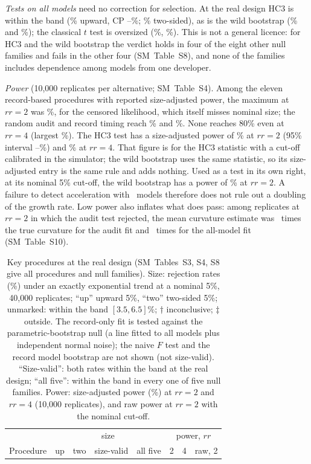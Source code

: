 \documentclass[aps,pre,twocolumn,superscriptaddress,nofootinbib,10pt]{revtex4-2}
\newcommand{\SM}{SM}
\newcommand{\rr}{rr}
\begin{document}
\emph{Tests on all models} need no correction for selection. At the real design HC3 is within the band (\aTwoHcUp\% upward, CP \aTwoHcUpLo--\aTwoHcUpHi\%; \aTwoHcTwo\% two-sided), as is the wild bootstrap (\aTwoWildUp\% and \aTwoWildTwo\%); the classical $t$ test is oversized (\aTwoOlsUp\%, \aTwoOlsTwo\%). This is not a general licence: for HC3 and the wild bootstrap the verdict holds in four of the eight other null families and fails in the other four (\SM\ Table~S8), and none of the families includes dependence among models from one developer.

\emph{Power} (10{,}000 replicates per alternative; \SM\ Table~S4). Among the eleven record-based procedures with reported size-adjusted power, the maximum at $\rr=2$ was \powMaxTwo\%, for the censored likelihood, which itself misses nominal size; the random audit and record timing reach \powAuditTwo\% and \powRrateTwo\%. None reaches 80\% even at $\rr=4$ (largest \powMaxFour\%). The HC3 test has a size-adjusted power of \aTwoPowHcTwo\% at $\rr=2$ (95\% interval \aTwoPowHcTwoLo--\aTwoPowHcTwoHi\%) and \aTwoPowHcFour\% at $\rr=4$. That figure is for the HC3 statistic with a cut-off calibrated in the simulator; the wild bootstrap uses the same statistic, so its size-adjusted entry is the same rule and adds nothing. Used as a test in its own right, at its nominal 5\% cut-off, the wild bootstrap has a power of \aTwoRawWildTwo\% at $\rr=2$. A failure to detect acceleration with \nModels\ models therefore does not rule out a doubling of the growth rate. Low power also inflates what does pass: among replicates at $\rr=2$ in which the audit test rejected, the mean curvature estimate was \typeMAuditTwo\ times the true curvature for the audit fit and \typeMAllTwo\ times for the all-model fit \cite{gelman2014} (\SM\ Table~S10).

\begin{table}[t]
\caption{Key procedures at the real design (\SM\ Tables~S3, S4, S8 give all procedures and null families). Size: rejection rates (\%) under an exactly exponential trend at a nominal 5\%, 40{,}000 replicates; ``up'' upward 5\%, ``two'' two-sided 5\%; unmarked: within the band $[3.5,6.5]\%$; $\dagger$ inconclusive; $\ddagger$ outside. The record-only fit is tested against the parametric-bootstrap null (a line fitted to all models plus independent normal noise); the naive $F$ test and the record model bootstrap are not shown (not size-valid). ``Size-valid'': both rates within the band at the real design; ``all five'': within the band in every one of five null families. Power: size-adjusted power (\%) at $\rr=2$ and $\rr=4$ (10{,}000 replicates), and raw power at $\rr=2$ with the nominal cut-off.}
\label{tab:main}
\begin{ruledtabular}
\begin{tabular}{lccccccc}
 & \multicolumn{4}{c}{size} & \multicolumn{3}{c}{power, $\rr$} \\
Procedure & up & two & size-valid & all five & 2 & 4 & raw, 2 \\
\hline

\end{tabular}
\end{ruledtabular}
\end{table}
\end{document}
